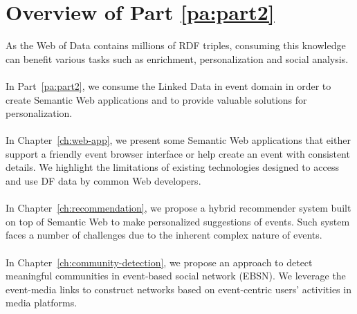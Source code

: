 \chapter*{Overview of Part \ref{pa:part2}}

As the Web of Data contains millions of RDF triples, consuming this knowledge can benefit various tasks such as enrichment, personalization and social analysis.
\\
\\
In Part~\ref{pa:part2}, we consume the Linked Data in event domain in order to create Semantic Web applications and to provide valuable solutions for personalization.
\\
\\
In Chapter~\ref{ch:web-app}, we present some Semantic Web applications that either support a friendly event browser interface or help create an event with consistent details. We highlight the limitations of existing technologies designed to access and use DF data by common Web developers.
\\
\\
In Chapter~\ref{ch:recommendation}, we propose a hybrid recommender system built on top of Semantic Web to make personalized suggestions of events. Such system faces a number of challenges due to the inherent complex nature of events.
\\
\\
In Chapter~\ref{ch:community-detection}, we propose an approach to detect meaningful communities in event-based social network (EBSN). We leverage the event-media links to construct networks based on event-centric users' activities in media platforms.
